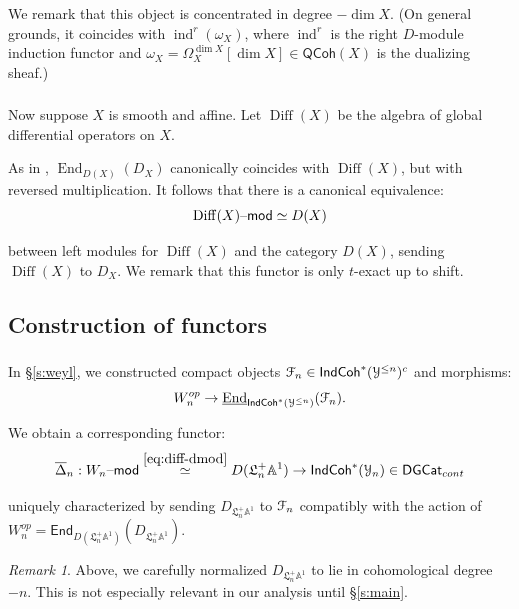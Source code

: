 \documentclass[reqno,11pt]{amsart}
\numberwithin{equation}{subsection}
\theoremstyle{remark}
\newtheorem{rem}[thm]{Remark}
\newcommand{\bA}{{\mathbb A}}
\newcommand{\sF}{{\EuScript F}}
\newcommand{\sY}{{\EuScript Y}}
\newcommand{\fL}{{\mathfrak L}}
\newcommand{\on}{\operatorname}
\newcommand{\ol}[1]{\overline{#1}{}}
\newcommand{\ul}{\underline}
\newcommand{\mathendash}{\text{\textendash}}
\newcommand{\End}{\on{End}}
\newcommand{\ind}{\on{ind}}
\renewcommand{\mod}{\mathendash\mathsf{mod}}
\newcommand{\DGCat}{\mathsf{DGCat}}
\newcommand{\TwoEnd}{\mathsf{End}}
\newcommand{\IndCoh}{\mathsf{IndCoh}}
\newcommand{\QCoh}{\mathsf{QCoh}}
\begin{document}
\noindent We remark that this object is concentrated in degree $-\dim X$.
(On general grounds, it coincides with $\ind^r(\omega_X)$, where 
$\ind^r$ is the right $D$-module induction functor and
$\omega_X = \Omega_X^{\dim X}[\dim X] \in \QCoh(X)$ is the
dualizing sheaf.)

\subsubsection{}

Now suppose $X$ is smooth and affine. Let $\on{Diff}(X)$ be the 
algebra of global differential operators on $X$.

As in \cite{crystals}, $\End_{D(X)}(D_X)$ canonically coincides with
$\on{Diff}(X)$, but with reversed multiplication. It follows that there
is a canonical equivalence:
%
\begin{equation}\label{eq:diff-dmod}
\on{Diff}(X)\mod \simeq D(X)
\end{equation}

\noindent between left modules for $\on{Diff}(X)$ and the category $D(X)$,
sending $\on{Diff}(X)$ to $D_X$. We remark that this functor is only
$t$-exact up to shift. 

\subsection{Construction of functors}

\subsubsection{}

In \S \ref{s:weyl}, we constructed compact objects
$\sF_n \in \IndCoh^*(\sY^{\leq n})^c$ and morphisms:
%
\[
W_n^{op} \to \ul{\End}_{\IndCoh^*(\sY^{\leq n})}(\sF_n).
\]

\noindent We obtain a corresponding functor:
%
\[
\ol{\Delta}_n:W_n\mod 
\overset{\eqref{eq:diff-dmod}}{\simeq} 
D(\fL_n^+\bA^1) \to \IndCoh^*(\sY_n)
\in \DGCat_{cont}
\]

\noindent uniquely characterized by sending $D_{\fL_n^+\bA^1}$ to 
$\sF_n$ compatibly with the action of $W_n^{op} = 
\TwoEnd_{D(\fL_n^+\bA^1)}(D_{\fL_n^+\bA^1})$. 

\begin{rem}

Above, we carefully normalized $D_{\fL_n^+ \bA^1}$ to lie in cohomological
degree $-n$. This is not especially relevant in our analysis 
until \S \ref{s:main}.

\end{rem}
\end{document}
